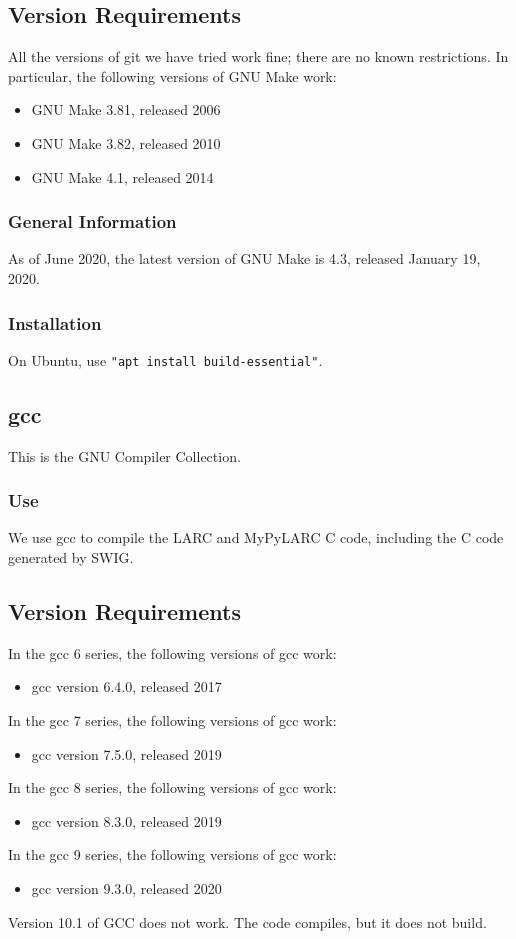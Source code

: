 \documentclass{article}
\begin{document}
\subsection{Version Requirements}
All the versions of git we have tried work fine;
there are no known restrictions.
In particular, the following versions of GNU Make work:
\begin{itemize}
\item GNU Make 3.81, released 2006
\item GNU Make 3.82, released 2010
\item GNU Make 4.1, released 2014
\end{itemize}
\subsubsection{General Information}
As of June 2020, the latest version of GNU Make is 4.3,
released January 19, 2020.
\subsubsection{Installation}
On Ubuntu, use {\tt "apt install build-essential"}.

\subsection{gcc}
This is the GNU Compiler Collection.
\subsubsection{Use}
We use gcc to compile the LARC and MyPyLARC C code,
including the C code generated by SWIG.
\subsection{Version Requirements}
In the gcc 6 series, the following versions of gcc work:
\begin{itemize}
\item gcc version 6.4.0, released 2017
\end{itemize}
In the gcc 7 series, the following versions of gcc work:
\begin{itemize}
\item gcc version 7.5.0, released 2019
\end{itemize}
In the gcc 8 series, the following versions of gcc work:
\begin{itemize}
\item gcc version 8.3.0, released 2019
\end{itemize}
In the gcc 9 series, the following versions of gcc work:
\begin{itemize}
\item gcc version 9.3.0, released 2020
\end{itemize}
Version 10.1 of GCC does not work.  The code compiles,
but it does not build.
\end{document}
